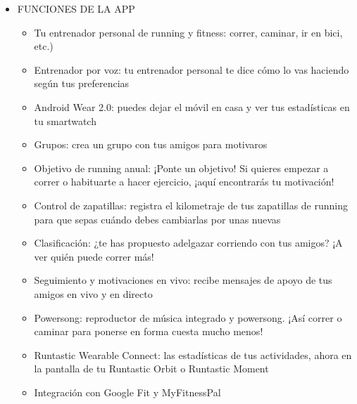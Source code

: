 \documentclass[a4paper, 11pt]{article}
\begin{document}
                  \begin{itemize}
                    \item{FUNCIONES DE LA APP}
                    \begin{itemize}
                    	\item {Tu entrenador personal de running y fitness: correr, caminar, ir en bici, etc.)}
                    	\item {Entrenador por voz: tu entrenador personal te dice cómo lo vas haciendo según tus preferencias}
                    	\item {Android Wear 2.0: puedes dejar el móvil en casa y ver tus estadísticas en tu smartwatch}
                    	\item {Grupos: crea un grupo con tus amigos para motivaros}
                    	\item {Objetivo de running anual: ¡Ponte un objetivo! Si quieres empezar a correr o habituarte a hacer ejercicio, ¡aquí encontrarás tu motivación!}
                    	\item {Control de zapatillas: registra el kilometraje de tus zapatillas de running para que sepas cuándo debes cambiarlas por unas nuevas}
                    	\item {Clasificación: ¿te has propuesto adelgazar corriendo con tus amigos? ¡A ver quién puede correr más!}
                    	\item {Seguimiento y motivaciones en vivo: recibe mensajes de apoyo de tus amigos en vivo y en directo}
                    	\item {Powersong: reproductor de música integrado y powersong. ¡Así correr o caminar para ponerse en forma cuesta mucho menos!}
                    	\item {Runtastic Wearable Connect: las estadísticas de tus actividades, ahora en la pantalla de tu Runtastic Orbit o Runtastic Moment}
                    	\item {Integración con Google Fit y MyFitnessPal}
                    \end{itemize}
                  \end{itemize}
\end{document}
